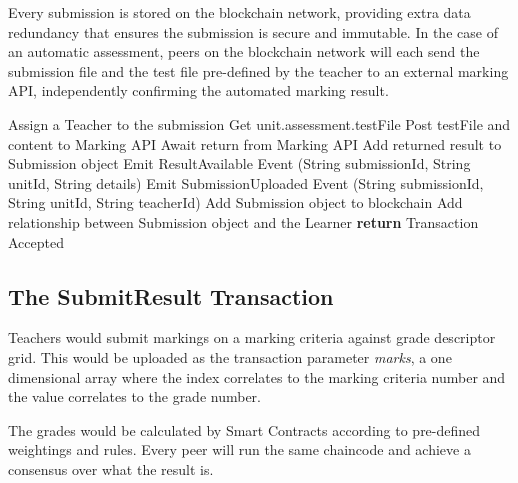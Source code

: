 Every submission is stored on the blockchain network, providing extra data redundancy that ensures 
the submission is secure and immutable. In the case of an automatic assessment, peers on the 
blockchain network will each send the submission file and the test file pre-defined by the teacher 
to an external marking API, independently confirming the automated marking result.
\clearpage
\begin{algorithm}
	\begin{algorithmic}[0]
		\State Assign a Teacher to the submission
		\State Get unit.assessment.testFile
		\State Post testFile and content to Marking API 
		\State Await return from Marking API
		\State Add returned result to Submission object
		\State Emit ResultAvailable Event (String submissionId, String unitId, String details)
		\State Emit SubmissionUploaded Event (String submissionId, String unitId, String teacherId)
		\EndIf
		\State Add Submission object to blockchain
		\State Add relationship between Submission object and the Learner
		\State \textbf{return} Transaction Accepted
		\EndFunction
	\end{algorithmic}
\end{algorithm}

\subsection{The SubmitResult Transaction}

Teachers would submit markings on a marking criteria against grade descriptor grid. This would be uploaded as the transaction
parameter \textit{marks}, a one dimensional array where the index correlates to the marking criteria number and
the value correlates to the grade number.

The grades would be calculated by Smart Contracts according to pre-defined weightings and rules. 
Every peer will run the same chaincode and achieve a consensus over what the result is.

